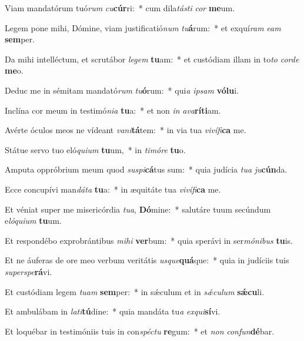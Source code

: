 \item Viam mandatórum tuó\textit{rum} \textit{cu}\textbf{cúr}ri:~* cum dila\textit{tás}\textit{ti} \textit{cor} \textbf{me}um.
\item Legem pone mihi, Dómine, viam justificatió\textit{num} \textit{tu}\textbf{á}rum:~* et exquí\textit{ram} \textit{e}\textit{am} \textbf{sem}per.
\item Da mihi intelléctum, et scrutábor \textit{le}\textit{gem} \textbf{tu}am:~* et custódiam illam in to\textit{to} \textit{cor}\textit{de} \textbf{me}o.
\item Deduc me in sémitam mandató\textit{rum} \textit{tu}\textbf{ó}rum:~* qui\textit{a} \textit{ip}\textit{sam} \textbf{vó}\textbf{lu}i.
\item Inclína cor meum in testimó\textit{ni}\textit{a} \textbf{tu}a:~* et non \textit{in} \textit{a}\textit{va}\textbf{rí}\textbf{ti}am.
\item Avérte óculos meos ne vídeant \textit{va}\textit{ni}\textbf{tá}tem:~* in via tua \textit{vi}\textit{ví}\textit{fi}\textbf{ca} me.
\item Státue servo tuo eló\textit{qui}\textit{um} \textbf{tu}um,~* in \textit{ti}\textit{mó}\textit{re} \textbf{tu}o.
\item Amputa oppróbrium meum quod \textit{su}\textit{spi}\textbf{cá}tus sum:~* quia judícia \textit{tu}\textit{a} \textit{ju}\textbf{cún}da.
\item Ecce concupívi man\textit{dá}\textit{ta} \textbf{tu}a:~* in æquitáte tua \textit{vi}\textit{ví}\textit{fi}\textbf{ca} me.
\item Et véniat super me misericórdia \textit{tu}\textit{a}, \textbf{Dó}mine:~* salutáre tuum secúndum e\textit{ló}\textit{qui}\textit{um} \textbf{tu}um.
\item Et respondébo exprobrántibus \textit{mi}\textit{hi} \textbf{ver}bum:~* quia sperávi in ser\textit{mó}\textit{ni}\textit{bus} \textbf{tu}is.
\item Et ne áuferas de ore meo verbum veritátis \textit{us}\textit{que}\textbf{quá}que:~* quia in judíciis tuis \textit{su}\textit{per}\textit{spe}\textbf{rá}vi.
\item Et custódiam legem \textit{tu}\textit{am} \textbf{sem}per:~* in sǽculum et in \textit{sǽ}\textit{cu}\textit{lum} \textbf{sǽ}\textbf{cu}li.
\item Et ambulábam in \textit{la}\textit{ti}\textbf{tú}dine:~* quia mandáta tu\textit{a} \textit{ex}\textit{qui}\textbf{sí}vi.
\item Et loquébar in testimóniis tuis in con\textit{spéc}\textit{tu} \textbf{re}gum:~* et \textit{non} \textit{con}\textit{fun}\textbf{dé}bar.
